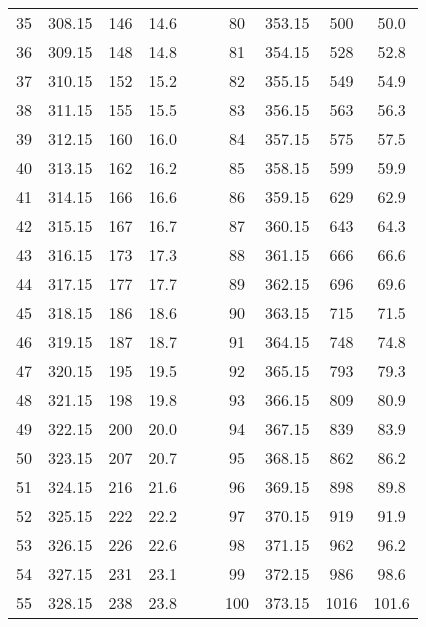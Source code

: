 \begin{table} [h!]
\begin{tabular}{c c c c c c c c c}
        35 & 308.15 &   146 &   14.6 & $\quad$ &  80 & 353.15 &   500 &   50.0 \\
        36 & 309.15 &   148 &   14.8 & $\quad$ &  81 & 354.15 &   528 &   52.8 \\
        37 & 310.15 &   152 &   15.2 & $\quad$ &  82 & 355.15 &   549 &   54.9 \\
        38 & 311.15 &   155 &   15.5 & $\quad$ &  83 & 356.15 &   563 &   56.3 \\
        39 & 312.15 &   160 &   16.0 & $\quad$ &  84 & 357.15 &   575 &   57.5 \\
        40 & 313.15 &   162 &   16.2 & $\quad$ &  85 & 358.15 &   599 &   59.9 \\
        41 & 314.15 &   166 &   16.6 & $\quad$ &  86 & 359.15 &   629 &   62.9 \\
        42 & 315.15 &   167 &   16.7 & $\quad$ &  87 & 360.15 &   643 &   64.3 \\
        43 & 316.15 &   173 &   17.3 & $\quad$ &  88 & 361.15 &   666 &   66.6 \\
        44 & 317.15 &   177 &   17.7 & $\quad$ &  89 & 362.15 &   696 &   69.6 \\
        45 & 318.15 &   186 &   18.6 & $\quad$ &  90 & 363.15 &   715 &   71.5 \\
        46 & 319.15 &   187 &   18.7 & $\quad$ &  91 & 364.15 &   748 &   74.8 \\
        47 & 320.15 &   195 &   19.5 & $\quad$ &  92 & 365.15 &   793 &   79.3 \\
        48 & 321.15 &   198 &   19.8 & $\quad$ &  93 & 366.15 &   809 &   80.9 \\
        49 & 322.15 &   200 &   20.0 & $\quad$ &  94 & 367.15 &   839 &   83.9 \\
        50 & 323.15 &   207 &   20.7 & $\quad$ &  95 & 368.15 &   862 &   86.2 \\
        51 & 324.15 &   216 &   21.6 & $\quad$ &  96 & 369.15 &   898 &   89.8 \\
        52 & 325.15 &   222 &   22.2 & $\quad$ &  97 & 370.15 &   919 &   91.9 \\
        53 & 326.15 &   226 &   22.6 & $\quad$ &  98 & 371.15 &   962 &   96.2 \\
        54 & 327.15 &   231 &   23.1 & $\quad$ &  99 & 372.15 &   986 &   98.6 \\
        55 & 328.15 &   238 &   23.8 & $\quad$ & 100 & 373.15 &  1016 &  101.6 \\
        \bottomrule
    \end{tabular}        
\end{table}

